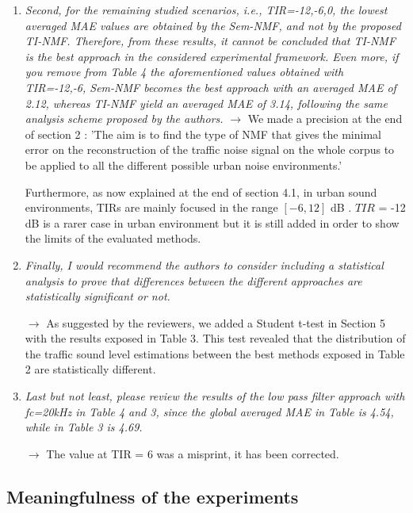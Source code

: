 \documentclass[10pt]{article}
\begin{document}
\begin{enumerate}
\item \emph{Second, for the remaining studied scenarios, i.e., TIR={-12,-6,0}, the lowest averaged MAE values are obtained by the Sem-NMF, and not by the proposed TI-NMF.
Therefore, from these results, it cannot be concluded that TI-NMF is the best approach in the considered experimental framework. Even more, if you remove from Table 4 the aforementioned values obtained with TIR={-12,-6}, Sem-NMF becomes the best approach with an averaged MAE of 2.12, whereas TI-NMF yield an averaged MAE of 3.14, following the same analysis scheme proposed by the authors.}
$\rightarrow$ We made a precision at the end of section 2 : 'The aim is to find the type of NMF that gives the minimal error on the reconstruction of the traffic noise signal on the whole corpus to be applied to all the different possible urban noise environments.'

Furthermore, as now explained at the end of section 4.1, in urban sound environments, TIRs are mainly focused in the range $\left[-6, 12\right]$ dB \cite{gloaguen_creation_2017}.
$TIR$ = -12 dB is a rarer case in urban environment but it is still added in order to show the limits of the evaluated methods.  %


\item \emph{Finally, I would recommend the authors to consider including a statistical analysis to prove that differences between the different approaches are statistically significant or not.}

$\rightarrow$ As suggested by the reviewers, we added a Student t-test in Section 5 with the results exposed in Table 3. This test revealed that the distribution of the traffic sound level estimations between the best methods exposed in Table 2 are statistically different.

\item \emph{Last but not least, please review the results of the low pass filter approach with fc=20kHz in Table 4 and 3, since the global averaged MAE in Table is 4.54, while in Table 3 is 4.69.}

$\rightarrow$ The value at TIR = 6 was a misprint, it has been corrected.


\end{enumerate}

\subsection{Meaningfulness of the experiments}
\end{document}
